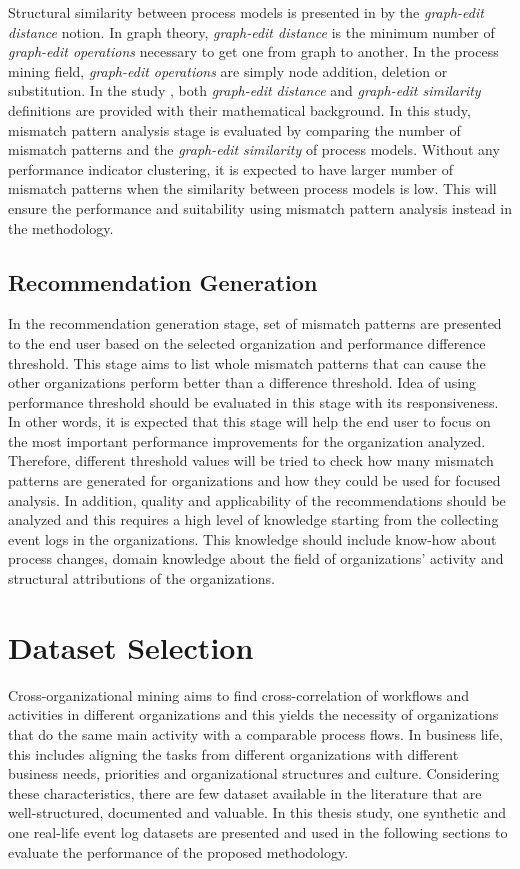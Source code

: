 Structural similarity between process models is presented in \cite{dijkman2011similarity} by the \textit{graph-edit distance} notion. In graph theory, \textit{graph-edit distance} is the minimum number of \textit{graph-edit operations} necessary to get one from graph to another. In the process mining field, \textit{graph-edit operations} are simply node addition, deletion or substitution. In the study \cite{dijkman2011similarity}, both \textit{graph-edit distance} and \textit{graph-edit similarity} definitions are provided with their mathematical background. In this study, mismatch pattern analysis stage is evaluated by comparing the number of mismatch patterns and the \textit{graph-edit similarity} of process models. Without any performance indicator clustering, it is expected to have larger number of mismatch patterns when the similarity between process models is low. This will ensure the performance and suitability using mismatch pattern analysis instead in the methodology.
\subsection{Recommendation Generation}
\label{subsec:recommendation-generation-eval}
In the recommendation generation stage, set of mismatch patterns are presented to the end user based on the selected organization and performance difference threshold. This stage aims to list whole mismatch patterns that can cause the other organizations perform better than a difference threshold. Idea of using performance threshold should be evaluated in this stage with its responsiveness. In other words, it is expected that this stage will help the end user to focus on the most important performance improvements for the organization analyzed. Therefore, different threshold values will be tried to check how many mismatch patterns are generated for organizations and how they could be used for focused analysis. In addition, quality and applicability of the recommendations should be analyzed and this requires a high level of knowledge starting from the collecting event logs in the organizations. This knowledge should include know-how about process changes, domain knowledge about the field of organizations' activity and structural attributions of the organizations.

\section{Dataset Selection}
\label{sec:dataset-selection}
Cross-organizational mining aims to find cross-correlation of workflows and activities in different organizations and this yields the necessity of organizations that do the same main activity with a comparable process flows. In business life, this includes aligning the tasks from different organizations with different business needs, priorities and organizational structures and culture. Considering these characteristics, there are few dataset available in the literature that are well-structured, documented and valuable. In this thesis study, one synthetic and one real-life event log datasets  are presented and used in the following sections to evaluate the performance of the proposed methodology.

